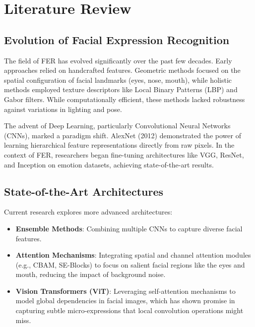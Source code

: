 \documentclass[a4paper,12pt]{article}
\begin{document}
\section{Literature Review}

\subsection{Evolution of Facial Expression Recognition}
The field of FER has evolved significantly over the past few decades. Early approaches relied on handcrafted features. Geometric methods focused on the spatial configuration of facial landmarks (eyes, nose, mouth), while holistic methods employed texture descriptors like Local Binary Patterns (LBP) and Gabor filters. While computationally efficient, these methods lacked robustness against variations in lighting and pose.

The advent of Deep Learning, particularly Convolutional Neural Networks (CNNs), marked a paradigm shift. AlexNet (2012) demonstrated the power of learning hierarchical feature representations directly from raw pixels. In the context of FER, researchers began fine-tuning architectures like VGG, ResNet, and Inception on emotion datasets, achieving state-of-the-art results.

\subsection{State-of-the-Art Architectures}
Current research explores more advanced architectures:
\begin{itemize}
    \item \textbf{Ensemble Methods}: Combining multiple CNNs to capture diverse facial features.
    \item \textbf{Attention Mechanisms}: Integrating spatial and channel attention modules (e.g., CBAM, SE-Blocks) to focus on salient facial regions like the eyes and mouth, reducing the impact of background noise.
    \item \textbf{Vision Transformers (ViT)}: Leveraging self-attention mechanisms to model global dependencies in facial images, which has shown promise in capturing subtle micro-expressions that local convolution operations might miss.
\end{itemize}
\end{document}

